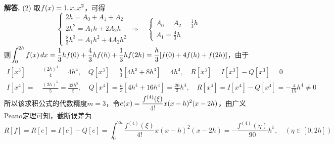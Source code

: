 \documentclass[12pt, a4paper, oneside]{ctexart}
\newenvironment{solution}{\par\noindent\textbf{解答. }}{\bigskip\par}
\begin{document}
\begin{solution}
    (2) 取$\displaystyle f(x) = 1,x, x^2$，可得
    \begin{equation*}
        \begin{cases}
            2h = A_0+A_1+A_2\\
            2h^2=A_1h+2A_2h\\
            \frac{8}{3}h^3 = A_1h^2+4A_2h^2
        \end{cases}
        \Rightarrow\quad\begin{cases}
            A_0 = A_2 = \frac{1}{3}h\\
            A_1 = \frac{4}{3}h
        \end{cases}
    \end{equation*}
    则$\displaystyle \int_0^{2h}f(x)\,dx = \frac{1}{3}hf(0)+\frac{4}{3}hf(h)+\frac{1}{3}hf(2h) = \frac{h}{3}[f(0)+4f(h)+f(2h)]$，由于
    \begin{equation*}
        \begin{aligned}
            I[x^3] =&\ \frac{(2h)^4}{4} = 4h^4,\quad Q[x^3] = \frac{h}{3}[4h^3+8h^3]=4h^4,\quad R[x^3] = I[x^3]-Q[x^3] = 0\\
            I[x^4] =&\ \frac{(2h)^5}{5} = \frac{32h^5}{5},\quad Q[x^4]=\frac{h}{3}[4h^4+16h^4]=\frac{20}{3}h^4,\quad R[x^4] = I[x^4]-Q[x^4] = -\frac{4}{15}h^4 \neq 0
        \end{aligned}
    \end{equation*}
    所以该求积公式的代数精度$m = 3$，令$\displaystyle e(x) = \frac{f^{(4)}(\xi)}{4!}x(x-h)^2(x-2h)$，由广义Peano定理可知，截断误差为
    \begin{equation*}
        R[f] = R[e] = I[e] - Q[e] = \int_0^{2h}\frac{f^{(4)}(\xi)}{4!}x(x-h)^2(x-2h) = -\frac{f^{(4)}(\eta)}{90}h^5,\quad(\eta\in[0,2h])
    \end{equation*}


\end{solution}
\end{document}
